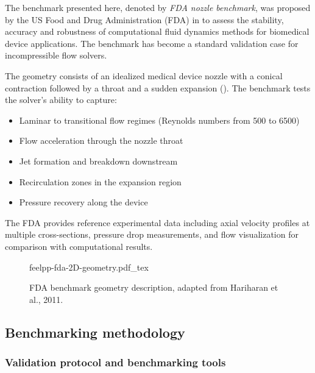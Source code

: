 The benchmark presented here, denoted by \emph{FDA nozzle benchmark}, was proposed by the US Food and Drug Administration (FDA) in \cite{hariharan_multilaboratory_2011} to assess the stability, accuracy and robustness of computational fluid dynamics methods for biomedical device applications. The benchmark has become a standard validation case for incompressible flow solvers.

The geometry consists of an idealized medical device nozzle with a conical contraction followed by a throat and a sudden expansion (). The benchmark tests the solver's ability to capture:
\begin{itemize}
\item Laminar to transitional flow regimes (Reynolds numbers from 500 to 6500)
\item Flow acceleration through the nozzle throat
\item Jet formation and breakdown downstream
\item Recirculation zones in the expansion region
\item Pressure recovery along the device
\end{itemize}

The FDA provides reference experimental data including axial velocity profiles at multiple cross-sections, pressure drop measurements, and flow visualization for comparison with computational results.

\begin{figure}[!ht]
  \centering
  \def\svgwidth{\textwidth}
  {feelpp-fda-2D-geometry.pdf_tex}
  \caption{FDA benchmark geometry description, adapted from Hariharan et al., 2011.}
  \label{fig:spec:app-feelpp-discr-2:fda:geometry}
\end{figure}




\subsection{Benchmarking methodology}
\subsubsection{Validation protocol and benchmarking tools}


